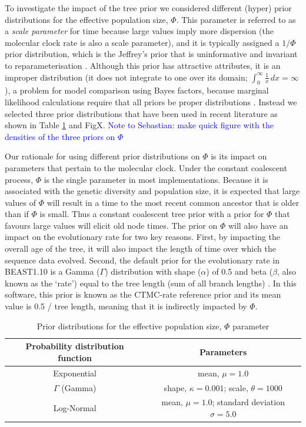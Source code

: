 \documentclass[10pt,letterpaper]{article}
\begin{document}
To investigate the impact of the tree prior we considered different (hyper) prior distributions for the effective population size, $\Phi$. This parameter is referred to as a \textit{scale parameter} for time because large values imply more dispersion (the molecular clock rate is also a scale parameter), and it is typically assigned a $1/\Phi$ prior distribution, which is the Jeffrey's prior that is uninformative and invariant to reparameterisation  \cite{drummond2002estimating}. Although this prior has attractive attributes, it is an improper distribution (it does not integrate to one over its domain; $\int_{0}^{\infty} \frac{1}{x}\,dx=\infty$), a problem for model comparison using Bayes factors, because marginal likelihood calculations require that all priors be proper distributions \cite{r2019marginal, baele2013proper}. Instead we selected three prior distributions that have been used in recent literature as shown in Table \ref{table:prior_distros_on_Phi} and FigX. \textcolor{blue}{Note to Sebastian: make quick figure with the densities of the three priors on $\Phi$}

Our rationale for using different prior distributions on $\Phi$ is its impact on parameters that pertain to the molecular clock. Under the constant coalescent process, $\Phi$ is the single parameter in most implementations. Because it is associated with the genetic diversity and population size, it is expected that large values of $\Phi$ will result in a time to the most recent common ancestor that is older than if $\Phi$ is small. Thus a constant coalescent tree prior with a prior for $\Phi$ that favours large values will elicit old node times. The prior on $\Phi$ will also have an impact on the evolutionary rate for two key reasons. First, by impacting the overall age of the tree, it will also impact the length of time over which the sequence data evolved. Second, the default prior for the evolutionary rate in BEAST1.10 is a Gamma ($\Gamma$) distribution with shape ($\alpha$) of 0.5 and beta ($\beta$, also known as the `rate') equal to the tree length (sum of all branch lengths) \cite{wang2014priors, ferreira2008bayesian}. In this software, this prior is known as the CTMC-rate reference prior and its mean value is 0.5 / tree length, meaning that it is indirectly impacted by $\Phi$. 

\begin{table}[h]
\caption{Prior distributions for the effective population size, $\Phi$ parameter}
\begin{center} 
	\label{table:prior_distros_on_Phi}
	\begin{tabular}{c|c}
		Probability distribution function & Parameters\\
		\hline
		Exponential & mean, $\mu=1.0$\\
        $\Gamma$ (Gamma) & shape, $\kappa=0.001$; scale, $\theta=1000$\\
		Log-Normal & mean, $\mu=1.0$; standard deviation $\sigma=5.0$\\
	\end{tabular}
\end{center}
\end{table}
\end{document}
